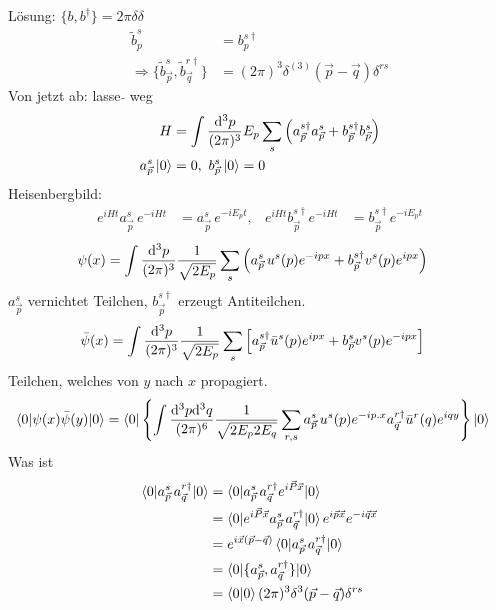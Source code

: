 Lösung: $\{b, b^\dagger\} = 2 \pi \delta \delta$
	\begin{align*}
		\tilde{b}^s_p &= b_p^{s\dagger} \\
		\Rightarrow \{\tilde{b}^s_{\vec{p}}, \tilde{b}^{r\dagger}_{\vec{q}}\} &= 
		(2 \pi)^3 \delta^{(3)} (\vec{p}- \vec{q}) \delta^{rs}
	\end{align*}
Von jetzt ab: lasse $\tilde{}$ weg 
	\begin{align*}
		H &= \int \frac{\mathrm{d}^3 p}{(2\pi)^3} E_p \sum_s 
		\left(
			a_{\vec{p}}^{s\dagger} a_{\vec{p}}^{s}
			+ b_{\vec{p}}^{s\dagger} b_{\vec{p}}^{s}
		\right) \\
		a_{\vec{p}}^{s} \ket{0}&= 0, ~b_{\vec{p}}^{s} \ket{0} = 0
	\end{align*}
Heisenbergbild:
	\begin{align*}
		e^{iHt}a_{\vec{p}}^{s} \,e^{-iHt} &= a_{\vec{p}}^{s}\, e^{-iE_p t},&
		e^{iHt}b_{\vec{p}}^{s\dagger} e^{-iHt} &= b_{\vec{p}}^{s\dagger} e^{-iE_p t}
	\end{align*}
	\begin{align*}
		\psi(x) &= \int \frac{\mathrm{d}^3 p}{(2\pi)^3} \frac{1}{\sqrt{2 E_p}} \sum_s
		\left(
			a_{\vec{p}}^{s} \,u^s(p) e^{-ipx} + b_{\vec{p}}^{s \dagger} v^s(p) e^{ipx}	
		\right)
	\end{align*}
$a_{\vec{p}}^{s}$ vernichtet Teilchen, $b_{\vec{p}}^{s \dagger}$ erzeugt Antiteilchen.
	\begin{align*}
		\bar{\psi} (x) &= 
		\int \frac{\mathrm{d}^3 p}{(2\pi)^3} \frac{1}{\sqrt{2 E_p}} \sum_s
		\left[
			a_{\vec{p}}^{s\dagger} \bar{u}^s(p) e^{ipx} + b_{\vec{p}}^{s} v^s(p) e^{-ipx}
		\right]
	\end{align*}
Teilchen, welches von $y$ nach $x$ propagiert.
	\begin{align*}
		\braket{0 | \psi(x) \bar{\psi}(y) | 0} &=
		\braket{0 | 
			\left\{\int \frac{\mathrm{d}^3 p \mathrm{d}^3 q}{(2\pi)^6} \frac{1}{\sqrt{2 E_p 2 E_q}}\sum_{r,s} a_{\vec{p}}^{s}\, u^s(p) e^{-ip.x} a_{\vec{q}}^{r\dagger} \bar{u}^r(q) e^{iqy} 
 			\right\}| 0}
	\end{align*}
Was ist 
	\begin{align*}
		\braket{0 | a_{\vec{p}}^{s} \,a_{\vec{q}}^{r \dagger} | 0} &= 
		\braket{0 | a_{\vec{p}}^{s} \, a_{\vec{q}}^{r \dagger}e^{i\vec{P}\vec{x}} | 0} \\
		&= \braket{0 | e^{i\vec{P}\vec{x}} a_{\vec{p}}^{s}\, a_{\vec{q}}^{r \dagger} | 0}
		e^{i\vec{p} \vec{x}} e^{-i\vec{q}\vec{x}} \\
		&= e^{i\vec{x}(\vec{p} - \vec{q})} 
		\braket{0 | a_{\vec{p}}^{s} \,a_{\vec{q}}^{r \dagger} | 0} \\
		&= \braket{0 | \{a_{\vec{p}}^{s} , a_{\vec{q}}^{r \dagger}\} | 0} \\
		&= \braket{0 | 0} (2\pi)^3 \delta^3 (\vec{p}- \vec{q}) \delta^{rs} 
	\end{align*}
